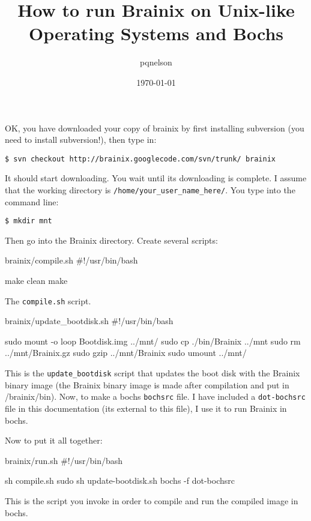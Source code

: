 \documentclass{article}
\title{How to run Brainix on Unix-like Operating Systems and Bochs}
\author{pqnelson}
\date{\today}
\begin{document}
 \maketitle

OK, you have downloaded your copy of brainix by first installing subversion (you need to install subversion!), then type in:

\verb|$ svn checkout http://brainix.googlecode.com/svn/trunk/ brainix|

It should start downloading. You wait until its downloading is complete. I assume that the working directory is \verb|/home/your_user_name_here/|. You type into the command line:

\verb|$ mkdir mnt|

Then go into the Brainix directory. Create several scripts:
\begin{code}{brainix/compile.sh}
#!/usr/bin/bash

make clean
make
\end{code}
The \verb|compile.sh| script.
\begin{code}{brainix/update\_bootdisk.sh}
#!/usr/bin/bash

sudo mount -o loop Bootdisk.img ../mnt/
sudo cp ./bin/Brainix ../mnt
sudo rm ../mnt/Brainix.gz
sudo gzip ../mnt/Brainix
sudo umount ../mnt/
\end{code}
This is the \verb|update_bootdisk| script that updates the boot disk with the Brainix binary image (the Brainix binary image is made after compilation and put in /brainix/bin). Now, to make a bochs \verb|bochsrc| file. I have included a \verb|dot-bochsrc| file in this documentation (its external to this file), I use it to run Brainix in bochs.

Now to put it all together:
\begin{code}{brainix/run.sh}
#!/usr/bin/bash

sh compile.sh
sudo sh update-bootdisk.sh
bochs -f dot-bochsrc
\end{code}
This is the script you invoke in order to compile and run the compiled image in bochs.
\end{document}
